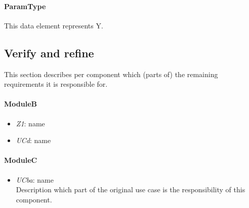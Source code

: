\paragraph{ParamType} This data element represents Y.

\subsection{Verify and refine}
This section describes per component which (parts of) the remaining
requirements it is responsible for.

\paragraph{ModuleB}
\begin{itemize}
	\item \emph{Z1}: name
	\item \emph{UCd}: name
\end{itemize}

\paragraph{ModuleC}
\begin{itemize}
	\item \emph{UCba}: name\\Description which part of the original use case is
	the responsibility of this component.
\end{itemize}
